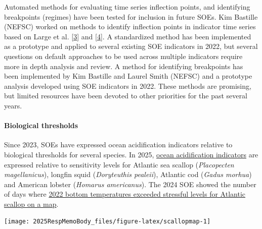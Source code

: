 \documentclass[
  10pt,
]{article}
\let\origfigure\figure
\let\endorigfigure\endfigure
\renewenvironment{figure}[1][2] {
    \expandafter\origfigure\expandafter[H]
} {
    \endorigfigure
}
\begin{document}
Automated methods for evaluating time series inflection points, and
identifying breakpoints (regimes) have been tested for inclusion in
future SOEs. Kim Bastille (NEFSC) worked on methods to identify
inflection points in indicator time series based on Large et al.
{[}\protect\hyperlink{ref-large_defining_2013}{3}{]} and
{[}\protect\hyperlink{ref-large_quantifying_2015}{4}{]}. A standardized
method has been implemented as a prototype and applied to several
existing SOE indicators in 2022, but several questions on default
approaches to be used across multiple indicators require more in depth
analysis and review. A method for identifying breakpoints has been
implemented by Kim Bastille and Laurel Smith (NEFSC) and a prototype
analysis developed using SOE indicators in 2022. These methods are
promising, but limited resources have been devoted to other priorities
for the past several years.

\hypertarget{biological-thresholds}{%
\paragraph{Biological thresholds}\label{biological-thresholds}}

Since 2023, SOEs have expressed ocean acidification indicators relative
to biological thresholds for several species. In 2025,
\href{https://noaa-edab.github.io/catalog/ocean_acidification.html}{ocean
acidification indicators} are expressed relative to sensitivity levels
for Atlantic sea scallop (\emph{Placopecten magellanicus}), longfin
squid (\emph{Doryteuthis pealeii}), Atlantic cod (\emph{Gadus morhua})
and American lobster (\emph{Homarus americanus}). The 2024 SOE showed
the number of days where
\href{https://noaa-edab.github.io/catalog/observation_synthesis.html\#key-results-and-visualizations-60}{2022
bottom temperatures exceeded stressful levels for Atlantic scallop on a
map}.

\begin{figure}

{\centering \texttt{[image: 2025RespMemoBody\_files/figure-latex/scallopmap-1]} 

}

\caption{The number of days in 2022 where bottom temperature was between 17 and 19 ℃ (stressful thermal temperatures for sea scallops) in each GLORYS grid cell. The gray lines show the sea scallop estimation areas, with the Elephant Trunk region highlighted in black lines.}\label{fig:scallopmap}
\end{figure}
\end{document}
